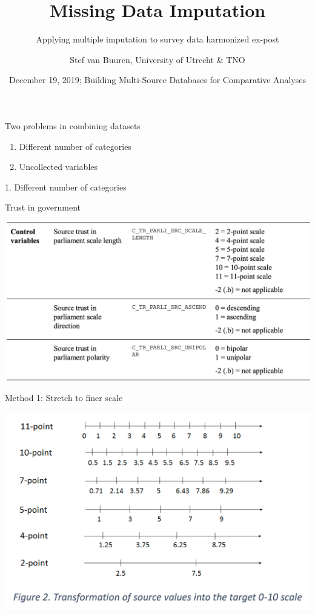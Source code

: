\documentclass[ignorenonframetext,aspectratio=43]{beamer}
\title{Missing Data Imputation}
\subtitle{Applying multiple imputation to survey data harmonized ex-post}
\author{Stef van Buuren, University of Utrecht \& TNO}
\date{December 19, 2019; Building Multi-Source Databases for Comparative
Analyses}
\providecommand{\tightlist}{%
  \setlength{\itemsep}{0pt}\setlength{\parskip}{0pt}}
\begin{document}
\frame{\titlepage}

\begin{frame}
\tableofcontents[hideallsubsections]
\end{frame}
\begin{frame}{Two problems in combining datasets}
\protect\hypertarget{two-problems-in-combining-datasets}{}

\begin{enumerate}
\tightlist
\item
  Different number of categories
\item
  Uncollected variables
\end{enumerate}

\end{frame}

\begin{frame}{1. Different number of categories}
\protect\hypertarget{different-number-of-categories}{}

\end{frame}

\begin{frame}{Trust in government}
\protect\hypertarget{trust-in-government}{}

\includegraphics{figures/controlvars.png}

\end{frame}

\begin{frame}{Method 1: Stretch to finer scale}
\protect\hypertarget{method-1-stretch-to-finer-scale}{}

\includegraphics{figures/figure2.png}

\end{frame}
\end{document}
